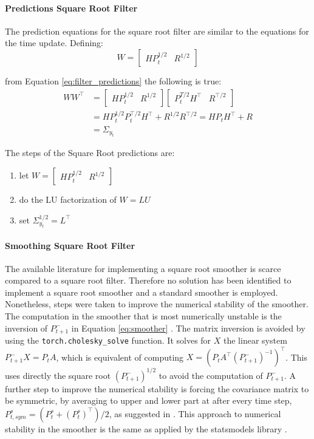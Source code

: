 \documentclass{article}
\begin{document}
\paragraph{Predictions Square Root Filter} The prediction equations for the square root filter are similar to the equations for the time update. Defining:
\begin{equation*}
    W = \begin{bmatrix}HP_{t}^{1/2} & R^{1/2}\end{bmatrix}
\end{equation*}

from Equation \ref{eq:filter_predictions} the following is true:
\begin{align*}
  WW^\top &=
  \begin{bmatrix}HP_{t}^{1/2} & R^{1/2}\end{bmatrix}\begin{bmatrix}P_{t}^{T/2}H^\top & R^{\top/2}\end{bmatrix} \\
  &= HP_{t}^{1/2}P_{t}^{\top/2}H^\top + R^{1/2}R^{\top/2} = HP_{t}H^\top + R \\ &= \Sigma_{y_t}
\end{align*}

The steps of the Square Root predictions are:
\begin{enumerate}
    \item let  $W = \begin{bmatrix}HP_t^{1/2} & R^{1/2}\end{bmatrix}$
    \item do the LU factorization of $W=LU$
    \item set $\Sigma_{y_t}^{1/2} = L^\top$
\end{enumerate}

\paragraph{Smoothing Square Root Filter} The available literature for implementing a square root smoother is scarce compared to a square root filter. Therefore no solution has been identified to implement a square root smoother and a standard smoother is employed.
Nonetheless, steps were taken to improve the numerical stability of the smoother.
The computation in the smoother that is most numerically unstable is the inversion of $P^-_{t+1}$ in Equation \ref{eq:smoother} \cite{mohinder_s_grewal_kalman_2001}. The matrix inversion is avoided by using the \verb|torch.cholesky_solve| function. It solves for $X$ the linear system $P^-_{t+1}X=P_tA$, which is equivalent of computing $X = (P_tA^\top(P^-_{t+1})^{-1})^\top$. This uses directly the square root $(P^-_{t+1})^{1/2}$ to avoid the computation of $P^-_{t+1}$. A further step to improve the numerical stability is forcing the covariance matrix to be symmetric, by averaging to upper and lower part at after every time step, $P^s_{t, sym} = (P^s_t + (P^s_t)^\top)/2$, as suggested in \textcite{dan_simon_optimal_2006}.
This approach to numerical stability in the smoother is the same as applied by the \textsf{statsmodels} library \cite{noauthor_statsmodelstsastatespacekalman_filterkalmanfilter_nodate}.
\end{document}
